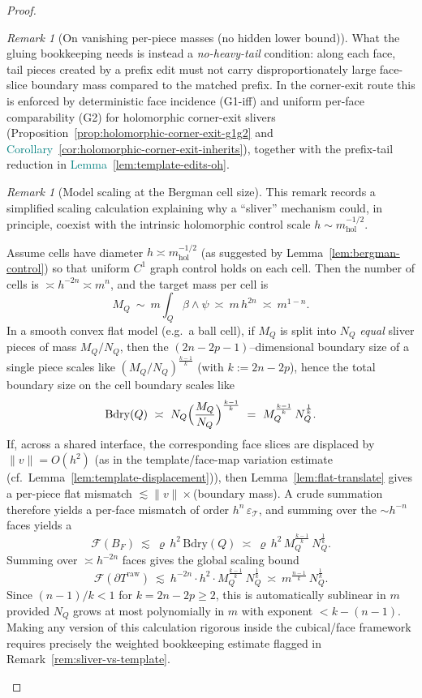 \documentclass[11pt]{article}
\newcommand{\REVMZ}[1]{\textcolor{teal}{#1}}  %
\numberwithin{equation}{section}  %
\theoremstyle{plain}
\theoremstyle{definition}
\theoremstyle{remark}
\newtheorem{remark}[theorem]{Remark}
\newcommand{\mhol}{m_{\mathrm{hol}}} %
\begin{document}
\begin{proof}
\begin{remark}[On vanishing per-piece masses (no hidden lower bound)]
\smallskip\noindent
What the gluing bookkeeping needs is instead a \emph{no-heavy-tail} condition: along each face, tail pieces created by a prefix edit must not carry
disproportionately large face-slice boundary mass compared to the matched prefix.  In the corner-exit route this is enforced by deterministic
face incidence (G1-iff) and uniform per-face comparability (G2) for holomorphic corner-exit slivers
(Proposition~\ref{prop:holomorphic-corner-exit-g1g2} and \REVMZ{Corollary~\ref{cor:holomorphic-corner-exit-inherits}}), together with the prefix-tail reduction
in \REVMZ{Lemma~\ref{lem:template-edits-oh}}.
\end{remark}




\begin{remark}[Model scaling at the Bergman cell size]\label{rem:sliver-bergman-scaling}
This remark records a simplified scaling calculation explaining why a ``sliver'' mechanism could, in principle, coexist with the intrinsic
holomorphic control scale $h\sim \mhol^{-1/2}$.

\smallskip\noindent
Assume cells have diameter $h\asymp \mhol^{-1/2}$ (as suggested by Lemma~\ref{lem:bergman-control}) so that uniform $C^1$ graph control holds on each cell.
Then the number of cells is $\asymp h^{-2n}\asymp m^{n}$, and the target mass per cell is
\[
M_Q\ \sim\ m\int_Q \beta\wedge\psi\ \asymp\ m\,h^{2n}\ \asymp\ m^{1-n}.
\]
In a smooth convex flat model (e.g.\ a ball cell), if $M_Q$ is split into $N_Q$ \emph{equal} sliver pieces of mass $M_Q/N_Q$, then the
$(2n-2p-1)$--dimensional boundary size of a single piece scales like $(M_Q/N_Q)^{\frac{k-1}{k}}$ (with $k:=2n-2p$), hence the total boundary size
on the cell boundary scales like
\[
\mathrm{Bdry}(Q)\ \asymp\ N_Q\Bigl(\frac{M_Q}{N_Q}\Bigr)^{\frac{k-1}{k}}
\ =\ M_Q^{\frac{k-1}{k}}\,N_Q^{\frac1k}.
\]
If, across a shared interface, the corresponding face slices are displaced by $\|v\|=O(h^2)$ (as in the template/face-map variation estimate (cf.\ Lemma~\ref{lem:template-displacement})),
then Lemma~\ref{lem:flat-translate} gives a per-piece flat mismatch $\lesssim \|v\|\times$(boundary mass).  A crude summation therefore yields a
per-face mismatch of order $h^n\,\varepsilon_{\mathcal T}$, and summing over the $\sim h^{-n}$ faces yields a
\[
\mathcal F(B_F)\ \lesssim\ \varrho\,h^2\,\mathrm{Bdry}(Q)\ \asymp\ \varrho\,h^2\,M_Q^{\frac{k-1}{k}}\,N_Q^{\frac1k}.
\]
Summing over $\asymp h^{-2n}$ faces gives the global scaling bound
\[
\mathcal F(\partial T^{\mathrm{raw}})\ \lesssim\ h^{-2n}\cdot h^2\cdot M_Q^{\frac{k-1}{k}}\,N_Q^{\frac1k}
\ \asymp\ m^{\frac{n-1}{k}}\,N_Q^{\frac1k}.
\]
Since $(n-1)/k<1$ for $k=2n-2p\ge 2$, this is automatically sublinear in $m$ provided $N_Q$ grows at most polynomially in $m$ with exponent $<k-(n-1)$.
Making any version of this calculation rigorous inside the cubical/face framework requires precisely the weighted bookkeeping estimate flagged in
Remark~\ref{rem:sliver-vs-template}.
\end{remark}



\end{proof}
\end{document}
